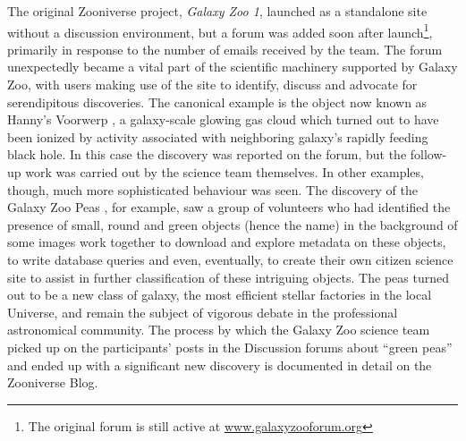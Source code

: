 \documentclass{sigchi}
\begin{document}
The original Zooniverse project, \emph{Galaxy Zoo 1}, launched as a standalone site without a discussion environment, but a forum was added soon after launch\footnote{The original forum is still active at \url{www.galaxyzooforum.org}}, primarily in response to the number of emails received by the team. The forum unexpectedly became a vital part of the scientific machinery supported by Galaxy Zoo, with users making use of the site to identify, discuss and advocate for serendipitous discoveries. The canonical example is the object now known as Hanny's Voorwerp \cite{voorwerp}, a galaxy-scale glowing gas cloud which turned out to have been ionized by activity associated with neighboring galaxy's rapidly feeding black hole. In this case the discovery was reported on the forum, but the follow-up work was carried out by the science team themselves. In other examples, though, much more sophisticated behaviour was seen. The discovery of the Galaxy Zoo Peas \cite{Peas}, for example, saw a group of volunteers who had identified the presence of small, round and green objects (hence the name) in the background of some images work together to download and explore metadata on these objects, to write database queries and even, eventually, to create their own citizen science site to assist in further classification of these intriguing objects. The peas turned out to be a new class of galaxy, the most efficient stellar factories in the local Universe, and remain the subject of vigorous debate in the professional astronomical community.  The process by which the Galaxy Zoo science team picked up on the participants' posts in the Discussion forums about ``green peas'' and ended up with a significant new discovery is documented in detail on the Zooniverse Blog\cite{story-of-the-peas}.
\end{document}
